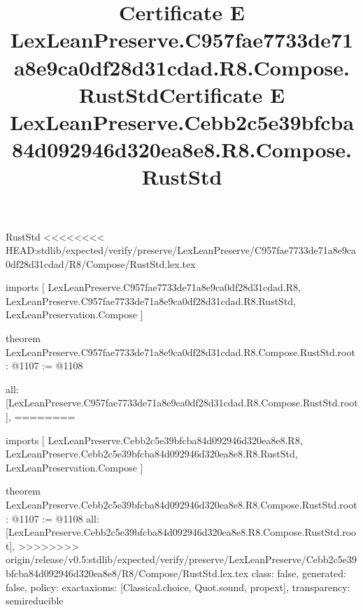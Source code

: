 \begin{lexlean}{RustStd}
<<<<<<<< HEAD:stdlib/expected/verify/preserve/LexLeanPreserve/C957fae7733de71a8e9ca0df28d31cdad/R8/Compose/RustStd.lex.tex
\title{Certificate E LexLeanPreserve.C957fae7733de71a8e9ca0df28d31cdad.R8.Compose.RustStd}
\begin{coremodule}
imports [
  LexLeanPreserve.C957fae7733de71a8e9ca0df28d31cdad.R8,
  LexLeanPreserve.C957fae7733de71a8e9ca0df28d31cdad.R8.RustStd,
  LexLeanPreservation.Compose
]

theorem LexLeanPreserve.C957fae7733de71a8e9ca0df28d31cdad.R8.Compose.RustStd.root : @1107 := @1108 {
  all: [LexLeanPreserve.C957fae7733de71a8e9ca0df28d31cdad.R8.Compose.RustStd.root],
========
\title{Certificate E LexLeanPreserve.Cebb2c5e39bfcba84d092946d320ea8e8.R8.Compose.RustStd}
\begin{coremodule}
imports [
  LexLeanPreserve.Cebb2c5e39bfcba84d092946d320ea8e8.R8,
  LexLeanPreserve.Cebb2c5e39bfcba84d092946d320ea8e8.R8.RustStd,
  LexLeanPreservation.Compose
]

theorem LexLeanPreserve.Cebb2c5e39bfcba84d092946d320ea8e8.R8.Compose.RustStd.root : @1107 := @1108 {
  all: [LexLeanPreserve.Cebb2c5e39bfcba84d092946d320ea8e8.R8.Compose.RustStd.root],
>>>>>>>> origin/release/v0.5:stdlib/expected/verify/preserve/LexLeanPreserve/Cebb2c5e39bfcba84d092946d320ea8e8/R8/Compose/RustStd.lex.tex
  class: false,
  generated: false,
  policy: exact{axioms: [Classical.choice, Quot.sound, propext]},
  transparency: semireducible
}


\end{coremodule}}
\end{coremodule}
\end{lexlean}
